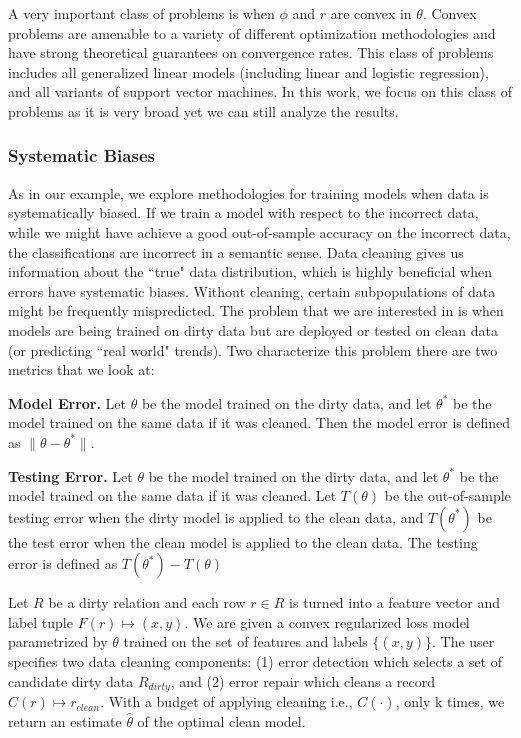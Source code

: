A very important class of problems is when $\phi$ and $r$ are convex in $\theta$.
Convex problems are amenable to a variety of different optimization methodologies
and have strong theoretical guarantees on convergence rates.
This class of problems includes all generalized linear models (including linear and logistic regression), and all variants of support vector machines.
In this work, we focus on this class of problems as it is very broad yet we can still analyze the results.

\subsubsection{Systematic Biases}
As in our example, we explore methodologies for training models when data is systematically biased.
If we train a model with respect to the incorrect data, while we might have achieve a good out-of-sample accuracy on the incorrect data, the classifications are incorrect in a semantic sense.
Data cleaning gives us information about the ``true" data distribution, which is highly beneficial when errors have systematic biases.
Without cleaning, certain subpopulations of data might be frequently mispredicted. 
The problem that we are interested in is when models are being trained on dirty data but are deployed or tested on clean data (or predicting ``real world" trends).
Two characterize this problem there are two metrics that we look at:

\vspace{0.5em}

\noindent\textbf{Model Error. } Let $\theta$ be the model trained on the dirty data, and let $\theta^*$ be the model trained on the same data if it was cleaned. Then the model error is defined as $\|\theta - \theta^*\|$.

\vspace{0.5em}

\noindent\textbf{Testing Error. } Let $\theta$ be the model trained on the dirty data, and let $\theta^*$ be the model trained on the same data if it was cleaned. Let $T(\theta)$ be the out-of-sample testing error when the dirty model is applied to the clean data, and $T(\theta^*)$ be the test error when the clean model is applied to the clean data. The testing error is defined as $T(\theta^*) - T(\theta)$

\begin{problem}\label{activeclean}\sloppy
Let $R$ be a dirty relation and each row $r \in R$ is 
turned into a feature vector and label tuple $F(r) \mapsto (x,y)$.
We are given a convex regularized loss model parametrized
by $\theta$ trained on the set of features and labels $\{(x,y)\}$.
The user specifies two data cleaning components: (1) error detection
which selects a set of candidate dirty data $R_{dirty}$, and (2) error 
repair which cleans a record $C(r) \mapsto r_{clean}$.
With a budget of applying cleaning i.e., $C(\cdot)$, only k times, we return an estimate $\hat{\theta}$ of the optimal clean model.
\end{problem}

